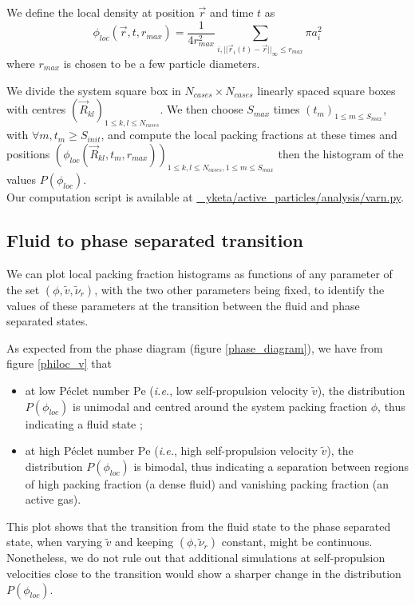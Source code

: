 \documentclass[class=report, float=false, crop=false]{standalone}
\begin{document}
We define the local density at position $\vec{r}$ and time $t$ as
\begin{equation}
\phi_{loc}(\vec{r}, t, r_{max}) = \frac{1}{4r_{max}^2} \sum_{i, ||\vec{r}_i(t) - \vec{r}||_{\infty} \leq r_{max}} \pi a_i^2
\label{philoc}
\end{equation}
where $r_{max}$ is chosen to be a few particle diameters.


We divide the system square box in $N_{cases} \times N_{cases}$ linearly spaced square boxes with centres $(\vec{R}_{kl})_{1 \leq k, l \leq N_{cases}}$. We then choose $S_{max}$ times $(t_m)_{1 \leq m \leq S_{max}}$, with $\forall m, t_m \geq S_{init}$, and compute the local packing fractions at these times and positions $(\phi_{loc}(\vec{R}_{kl}, t_m, r_{max}))_{1 \leq k, l \leq N_{cases}, 1 \leq m \leq S_{max}}$ then the histogram of the values $P(\phi_{loc})$.\\

Our computation script is available at \href{https://github.com/yketa/active_particles/blob/master/analysis/varn.py}{{\faGithub~ yketa/active\_particles/analysis/varn.py}}.

\subsection{Fluid to phase separated transition}

We can plot local packing fraction histograms as functions of any parameter of the set $(\phi, \tilde{v}, \tilde{\nu}_r)$, with the two other parameters being fixed, to identify the values of these parameters at the transition between the fluid and phase separated states.


As expected from the phase diagram (figure \ref{phase_diagram}), we have from figure \ref{philoc_v} that
\begin{itemize}
  \item at low P\'eclet number $\text{Pe}$ (\textit{i.e.}, low self-propulsion velocity $\tilde{v}$), the distribution $P(\phi_{loc})$ is unimodal and centred around the system packing fraction $\phi$, thus indicating a fluid state ;
  \item at high P\'eclet number $\text{Pe}$ (\textit{i.e.}, high self-propulsion velocity $\tilde{v}$), the distribution $P(\phi_{loc})$ is bimodal, thus indicating a separation between regions of high packing fraction (a dense fluid) and vanishing packing fraction (an active gas).
\end{itemize}
This plot shows that the transition from the fluid state to the phase separated state, when varying $\tilde{v}$ and keeping $(\phi, \tilde{\nu}_r)$ constant, might be continuous. Nonetheless, we do not rule out that additional simulations at self-propulsion velocities close to the transition would show a sharper change in the distribution $P(\phi_{loc})$.
\end{document}
